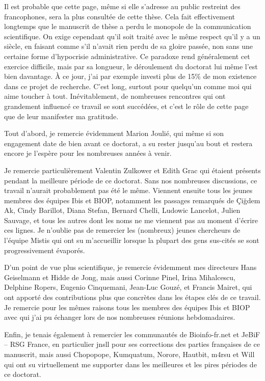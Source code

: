 \cleardoublepage
{}
\begin{acknowledgements}

Il est probable que cette page, même si elle s'adresse au public restreint des francophones, sera la plus consultée de cette thèse.
Cela fait effectivement longtemps que le manuscrit de thèse a perdu le monopole de la communication scientifique.
On exige cependant qu'il soit traité avec le même respect qu'il y a un siècle, en faisant comme s'il n'avait rien perdu de sa gloire passée, non sans une certaine forme d'hypocrisie administrative.
Ce paradoxe rend généralement cet exercice difficile, mais par sa longueur, le déroulement du doctorat lui même l'est bien davantage.
À ce jour, j'ai par exemple investi plus de 15\% de mon existence dans ce projet de recherche.
C'est long, surtout pour quelqu'un comme moi qui aime toucher à tout.
Inévitablement, de nombreuses rencontres qui ont grandement influencé ce travail se sont succédées, et c'est le rôle de cette page que de leur manifester ma gratitude.

Tout d'abord, je remercie évidemment Marion Joulié, qui même si son engagement date de bien avant ce doctorat, a su rester jusqu'au bout et restera encore je l'espère pour les nombreuses années à venir.

Je remercie particulièrement Valentin Zulkower et Edith Grac qui étaient présents pendant la meilleure période de ce doctorat.
Sans nos nombreuses discussions, ce travail n'aurait probablement pas été le même.
Viennent ensuite tous les jeunes membres des équipes Ibis et BIOP, notamment les passages remarqués de Çiğdem Ak, Cindy Barillot, Diana Stefan, Bernard Chelli, Ludowic Lancelot, Julien Sauvage, et tous les autres dont les noms ne me viennent pas au moment d'écrire ces lignes.
Je n'oublie pas de remercier les (nombreux) jeunes chercheurs de l'équipe Mistis qui ont su m'accueillir lorsque la plupart des gens sus-cités se sont progressivement évaporés.

D'un point de vue plus scientifique, je remercie évidemment mes directeurs Hans Geiselmann et Hidde de Jong, mais aussi Corinne Pinel, Irina Mihalcescu, Delphine Ropers, Eugenio Cinquemani, Jean-Luc Gouzé, et Francis Mairet, qui ont apporté des contributions plus que concrètes dans les étapes clés de ce travail.
Je remercie pour les mêmes raisons tous les membres des équipes Ibis et BIOP avec qui j'ai pu échanger lors de nos nombreuses réunions hebdomadaires.

Enfin, je tenais également à remercier les communautés de Bioinfo-fr.net et JeBiF -- RSG France, en particulier jnsll pour ses corrections des parties françaises de ce manuscrit, mais aussi Chopopope, Kumquatum, Norore, Hautbit, m4rsu et Will qui ont su virtuellement me supporter dans les meilleures et les pires périodes de ce doctorat.
\end{acknowledgements}
